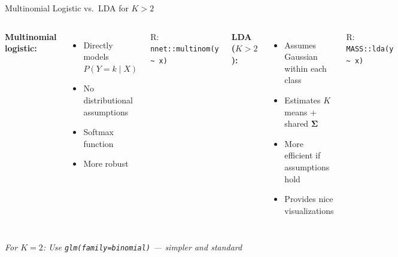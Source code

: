 \documentclass[aspectratio=169, 11pt]{beamer}
\begin{document}
\begin{frame}{Multinomial Logistic vs.\ LDA for $K > 2$}

\begin{columns}
\textbf{Multinomial logistic:}
\begin{itemize}
  \item Directly models $P(Y = k \mid X)$
  \item No distributional assumptions
  \item Softmax function
  \item More robust
\end{itemize}

\vspace{0.3em}
R: \texttt{nnet::multinom(y \textasciitilde{} x)}

\textbf{LDA ($K > 2$):}
\begin{itemize}
  \item Assumes Gaussian within each class
  \item Estimates $K$ means + shared $\boldsymbol{\Sigma}$
  \item More efficient if assumptions hold
  \item Provides nice visualizations
\end{itemize}

\vspace{0.3em}
R: \texttt{MASS::lda(y \textasciitilde{} x)}
\end{columns}

\vspace{0.5em}
\centering
\textit{For $K = 2$: Use \texttt{glm(family=binomial)} --- simpler and standard}
\end{frame}
\end{document}
